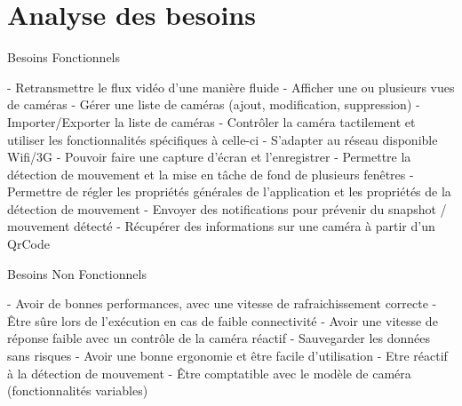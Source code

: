 \documentclass[a4paper,10pt]{report}
\begin{document}
\author{Jerome NAHELOU, Quentin NEBOUT, Romain SOLVE, Fabien QUINTARD}

\chapter{Analyse des besoins}
Besoins Fonctionnels

- Retransmettre le flux vidéo d'une manière fluide
- Afficher une ou plusieurs vues de caméras
- Gérer une liste de caméras (ajout, modification, suppression)
- Importer/Exporter la liste de caméras
- Contrôler la caméra tactilement et utiliser les fonctionnalités spécifiques à celle-ci
- S'adapter au réseau disponible Wifi/3G
- Pouvoir faire une capture d'écran et l'enregistrer
- Permettre la détection de mouvement et la mise en tâche de fond de plusieurs fenêtres
- Permettre de régler les propriétés générales de l'application et les propriétés de la détection de mouvement
- Envoyer des notifications pour prévenir du snapshot / mouvement détecté 
- Récupérer des informations sur une caméra à partir d'un QrCode

Besoins Non Fonctionnels

- Avoir de bonnes performances, avec une vitesse de rafraichissement correcte
- Être sûre lors de l'exécution en cas de faible connectivité
- Avoir une vitesse de réponse faible avec un contrôle de la caméra réactif
- Sauvegarder les données sans risques
- Avoir une bonne ergonomie et être facile d'utilisation
- Etre réactif à la détection de mouvement
- Être comptatible avec le modèle de caméra (fonctionnalités variables)
\end{document}

